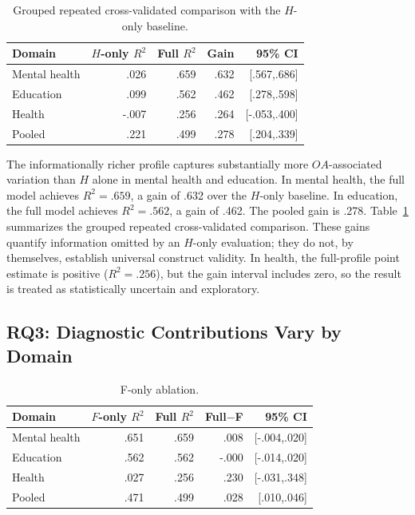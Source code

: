 \documentclass[manuscript,review,anonymous]{acmart}
\begin{document}
\begin{table}[t]
\centering
\caption{Grouped repeated cross-validated comparison with the $H$-only baseline.}
\label{tab:cv}
\begin{tabular}{lrrrr}
\toprule
Domain & $H$-only $R^2$ & Full $R^2$ & Gain & 95\% CI\\
\midrule
Mental health & .026 & .659 & .632 & [.567,.686]\\
Education & .099 & .562 & .462 & [.278,.598]\\
Health & -.007 & .256 & .264 & [-.053,.400]\\
Pooled & .221 & .499 & .278 & [.204,.339]\\
\bottomrule
\end{tabular}
\end{table}

The informationally richer profile captures substantially more $OA$-associated variation than $H$ alone in mental health and education. In mental health, the full model achieves $R^2=.659$, a gain of .632 over the $H$-only baseline. In education, the full model achieves $R^2=.562$, a gain of .462. The pooled gain is .278. Table~\ref{tab:cv} summarizes the grouped repeated cross-validated comparison. These gains quantify information omitted by an $H$-only evaluation; they do not, by themselves, establish universal construct validity. In health, the full-profile point estimate is positive ($R^2=.256$), but the gain interval includes zero, so the result is treated as statistically uncertain and exploratory.

\subsection{RQ3: Diagnostic Contributions Vary by Domain}

\begin{table}[t]
\centering
\caption{F-only ablation.}
\label{tab:ablation}
\begin{tabular}{lrrrr}
\toprule
Domain & $F$-only $R^2$ & Full $R^2$ & Full$-$F & 95\% CI\\
\midrule
Mental health & .651 & .659 & .008 & [-.004,.020]\\
Education & .562 & .562 & -.000 & [-.014,.020]\\
Health & .027 & .256 & .230 & [-.031,.348]\\
Pooled & .471 & .499 & .028 & [.010,.046]\\
\bottomrule
\end{tabular}
\end{table}
\end{document}
